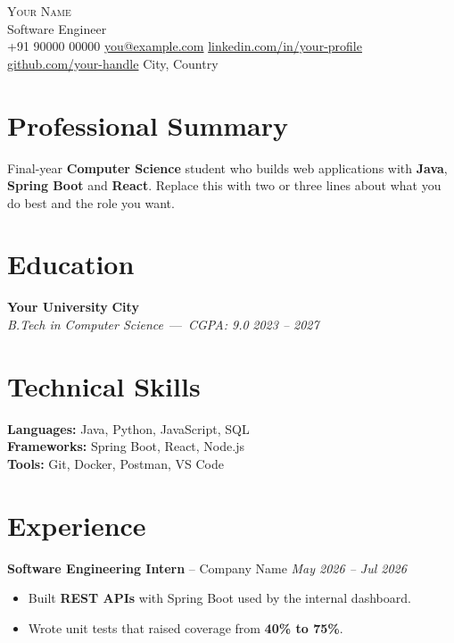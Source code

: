 \documentclass[10pt,a4paper]{article}
\newenvironment{resumebody}{\begin{list}{}{\setlength{\leftmargin}{0.8em}\setlength{\topsep}{0pt}\setlength{\itemsep}{0pt}\setlength{\parsep}{0pt}}\item[]}{\end{list}}
\begin{document}
\begin{center}
{\Huge\scshape\color{accent} Your Name}\\[5pt]
{\large \color{accent}Software Engineer}\\[4pt]
{\small +91 90000 00000 \textbullet{} \href{mailto:you@example.com}{you@example.com} \textbullet{} \href{https://linkedin.com/in/your-profile}{linkedin.com/in/your-profile} \textbullet{} \href{https://github.com/your-handle}{github.com/your-handle} \textbullet{} City, Country}
\end{center}

\section{Professional Summary}
\begin{resumebody}
Final-year \textbf{Computer Science} student who builds web applications with \textbf{Java}, \textbf{Spring Boot} and \textbf{React}. Replace this with two or three lines about what you do best and the role you want.
\end{resumebody}

\section{Education}
\begin{resumebody}
\textbf{Your University} \hfill \textbf{City}\\
\textit{B.Tech in Computer Science} \,---\, \textit{CGPA: 9.0} \hfill \textit{2023 -- 2027}
\end{resumebody}

\section{Technical Skills}
\begin{resumebody}
\textbf{Languages:} Java, Python, JavaScript, SQL\\
\textbf{Frameworks:} Spring Boot, React, Node.js\\
\textbf{Tools:} Git, Docker, Postman, VS Code
\end{resumebody}

\section{Experience}
\begin{resumebody}
  \textbf{Software Engineering Intern} -- Company Name \hfill \textit{May 2026 -- Jul 2026}\\[-9pt]
  \begin{itemize}
    \item Built \textbf{REST APIs} with Spring Boot used by the internal dashboard.
    \item Wrote unit tests that raised coverage from \textbf{40\% to 75\%}.
  \end{itemize}
  \vspace{3pt}
\end{resumebody}
\end{document}
